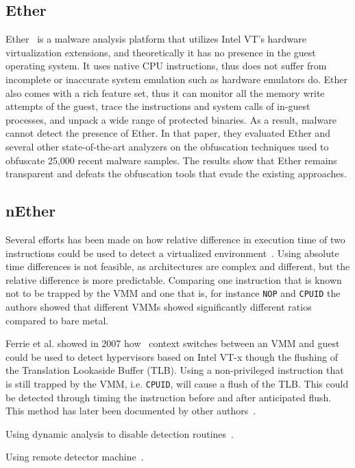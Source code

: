 \subsection{Ether}
Ether~\cite{ether} is a malware analysis platform that utilizes Intel VT's hardware virtualization extensions, and theoretically it has no presence in the guest operating system. It uses native CPU instructions, thus does not suffer from incomplete or inaccurate system emulation such as hardware emulators do. Ether also comes with a rich feature set, thus it can monitor all the memory write attempts of the guest, trace the instructions and system calls of in-guest processes, and unpack a wide range of protected binaries. As a result, malware cannot detect the presence of Ether. In that paper, they evaluated Ether and several other state-of-the-art analyzers on the obfuscation techniques used to obfuscate 25,000 recent malware samples. The results show that Ether remains transparent and defeats the obfuscation tools that evade the existing approaches.

\subsection{nEther}



Several efforts has been made on how relative difference in execution time of
two instructions could be used to detect a virtualized
environment~\cite{raffetseder2007, thompson}. Using absolute time differences is
not feasible, as architectures are complex and different, but the relative
difference is more predictable. Comparing one instruction that is known not to
be trapped by the VMM and one that is, for instance {\tt NOP} and {\tt CPUID}
the authors showed that different VMMs showed significantly different ratios
compared to bare metal.

Ferrie {et al.} showed in 2007 how~\cite{ferrie2007} context switches between an
VMM and guest could be used to detect hypervisors based on Intel VT-x though the
flushing of the Translation Lookaside Buffer (TLB). Using a non-privileged
instruction that is still trapped by the VMM, i.e. {\tt CPUID}, will cause a
flush of the TLB. This could be detected through timing the instruction before
and after anticipated flush. This method has later been documented by other
authors~\cite{thompson}.

Using dynamic analysis to disable detection routines~\cite{kang2009}.

Using remote detector machine~\cite{franklin2008}.

